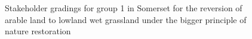 \documentclass[
  12pt,
  letterpaper,
  DIV=11,
  numbers=noendperiod]{scrartcl}
\begin{document}
\begin{figure}[H]


\caption{\label{fig-SomArMoreG1}Stakeholder gradings for group 1 in
Somerset for the reversion of arable land to lowland wet grassland under
the bigger principle of nature restoration}

\end{figure}%
\end{document}
